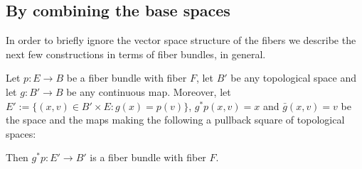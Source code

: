\subsection{By combining the base spaces}
In order to briefly ignore the vector space structure of the fibers we describe the next few constructions in terms of fiber bundles, in general.

\begin{proposition} Let $p:E\to B$ be a fiber bundle with fiber $F$, let $B'$ be any topological space and let $g:B'\to B$ be any continuous map. Moreover, let $E':=\{(x,v)\in B'\times E:g(x)=p(v)\}$, $g^*p(x,v)=x$ and $\bar{g}(x,v)=v$ be the space and the maps making the following a pullback square of topological spaces:
\begin{center}
\end{center}
Then $g^*p:E'\to B'$ is a fiber bundle with fiber $F$.
\end{proposition}
